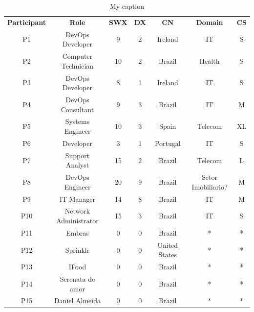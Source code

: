\begin{table}[t]
\centering
\caption{My caption}
\label{my-label}
\begin{tabular}{ccccccc}
\textbf{Participant} & \textbf{Role}         & \textbf{SWX} & \textbf{DX} & \textbf{CN}   & \textbf{Domain}    & \multicolumn{1}{l}{\textbf{CS}} \\
P1                   & DevOps Developer      & 9            & 2           & Ireland       & IT                 & S                               \\
P2                   & Computer Technician   & 10           & 2           & Brazil        & Health             & S                               \\
P3                   & DevOps Developer      & 8            & 1           & Ireland       & IT                 & S                               \\
P4                   & DevOps Consultant     & 9            & 3           & Brazil        & IT                 & M                               \\
P5                   & Systems Engineer      & 10           & 3           & Spain         & Telecom            & XL                              \\
P6                   & Developer             & 3            & 1           & Portugal      & IT                 & S                               \\
P7                   & Support Analyst       & 15           & 2           & Brazil        & Telecom            & L                               \\
P8                   & DevOps Engineer       & 20           & 9           & Brazil        & Setor Imobiliario? & M                               \\
P9                   & IT Manager            & 14           & 8           & Brazil        & IT                 & M                               \\
P10                  & Network Administrator & 15           & 3           & Brazil        & IT                 & S                               \\
P11                  & Embras                & 0            & 0           & Brazil        & *                  & *                               \\
P12                  & Sprinklr              & 0            & 0           & United States & *                  & *                               \\
P13                  & IFood                 & 0            & 0           & Brazil        & *                  & *                               \\
P14                  & Serenata de amor      & 0            & 0           & Brazil        & *                  & *                               \\
P15                  & Daniel Almeida        & 0            & 0           & Brazil        & *                  & *
\end{tabular}
\end{table}

